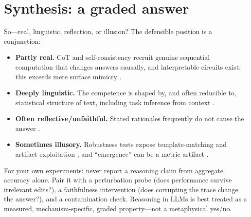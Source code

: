 \documentclass[11pt]{article}
\begin{document}
\section{Synthesis: a graded answer}
So---real, linguistic, reflection, or illusion? The defensible position is a conjunction:
\begin{itemize}[leftmargin=*]
  \item \textbf{Partly real.} CoT and self-consistency recruit genuine sequential computation that changes answers causally, and interpretable circuits exist; this exceeds mere surface mimicry \citep{wei2022chain,wang2023selfconsistency,olsson2022incontext}.
  \item \textbf{Deeply linguistic.} The competence is shaped by, and often reducible to, statistical structure of text, including task inference from context \citep{xie2022explanation}.
  \item \textbf{Often reflective/unfaithful.} Stated rationales frequently do not cause the answer \citep{turpin2023language}.
  \item \textbf{Sometimes illusory.} Robustness tests expose template-matching and artifact exploitation \citep{gururangan2018annotation,mccoy2019right,mirzadeh2024gsm}, and ``emergence'' can be a metric artifact \citep{schaeffer2023emergent}.
\end{itemize}

For your own experiments: never report a reasoning claim from aggregate accuracy alone. Pair it with a perturbation probe (does performance survive irrelevant edits?), a faithfulness intervention (does corrupting the trace change the answer?), and a contamination check. Reasoning in LLMs is best treated as a measured, mechanism-specific, graded property---not a metaphysical yes/no.



\end{document}
